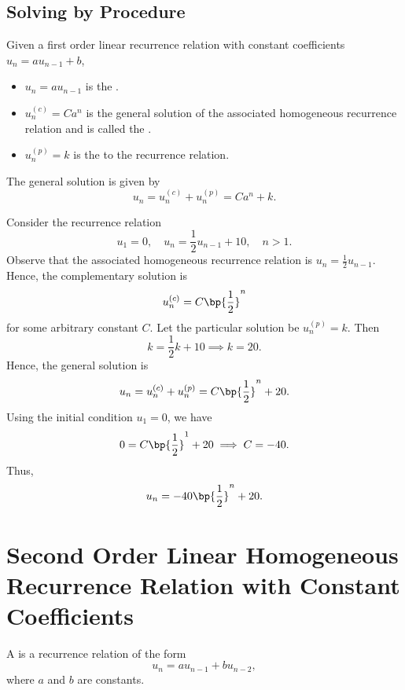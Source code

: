 \subsection{Solving by Procedure}

\begin{definition}
    Given a first order linear recurrence relation with constant coefficients $u_n = au_{n-1} + b$,
    \begin{itemize}
        \item $u_n = au_{n-1}$ is the .
        \item $u_n^{(c)} = Ca^n$ is the general solution of the associated homogeneous recurrence relation and is called the .
        \item $u_n^{(p)} = k$ is the  to the recurrence relation.
    \end{itemize}
\end{definition}

\begin{fact}
    The general solution is given by \[u_n = u_n^{(c)} + u_n^{(p)} = Ca^n + k.\]
\end{fact}

\begin{example}
    Consider the recurrence relation \[u_1 = 0, \quad u_n = \frac12 u_{n-1} + 10, \quad n > 1.\] Observe that the associated homogeneous recurrence relation is $u_n = \frac12 u_{n-1}$. Hence, the complementary solution is \[u_n^{(c)} = C\bp{\frac12}^n\] for some arbitrary constant $C$. Let the particular solution be $u_n^{(p)} = k$. Then \[k = \frac12 k + 10 \implies k = 20.\] Hence, the general solution is \[u_n = u_n^{(c)} + u_n^{(p)} = C\bp{\frac12}^n + 20.\] Using the initial condition $u_1 = 0$, we have \[0 = C\bp{\frac12}^1 + 20 \implies C = -40.\] Thus, \[u_n =-40\bp{\frac12}^n + 20.\]
\end{example}

\clearpage
\section{Second Order Linear Homogeneous Recurrence Relation with Constant Coefficients}

\begin{definition}
    A  is a recurrence relation of the form \[u_n = a u_{n-1} + b u_{n-2},\] where $a$ and $b$ are constants.
\end{definition}

